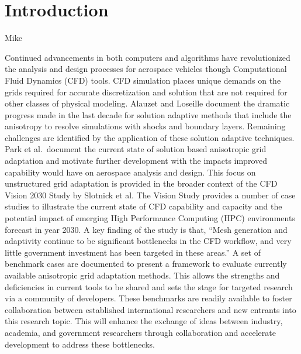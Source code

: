 \documentclass[3p,times,procedia,number]{elsarticle}
\begin{document}



\section{Introduction}
{\color{red} Mike}

Continued advancements in both computers and algorithms 
have revolutionized the analysis and design processes for
aerospace vehicles though Computational Fluid Dynamics (CFD) tools.
CFD simulation places unique demands on the grids required for
accurate discretization and solution that are not required
for other classes of physical modeling.
Alauzet and Loseille\cite{alauzet-loseille-decade-aniso-adapt-cfd}
document the dramatic progress made in the last decade
for solution adaptive methods that include the anisotropy to
resolve simulations with shocks and boundary layers.
Remaining challenges are identified
by the application of these solution adaptive techniques.
Park et al.\cite{park-unstruct-adapt-status-cfd2030}~document
the current state of solution based anisotropic
grid adaptation and motivate further development with 
the impacts improved capability would have on
aerospace analysis and design.
This focus on unstructured grid adaptation
is provided in the broader context of the 
CFD Vision 2030 Study by Slotnick et al.\cite{cfd-vision-2030}
The Vision Study provides a number of case studies
to illustrate the current state of CFD capability and capacity and the
potential impact of emerging High Performance Computing (HPC)
environments forecast in year 2030.
A key finding of the study is that, 
``Mesh generation and adaptivity continue to be significant bottlenecks
in the CFD workflow, and very little government investment has been targeted
in these areas.''\cite{cfd-vision-2030}
A set of benchmark cases are documented to present a framework to evaluate
currently available anisotropic grid adaptation methods. 
This allows the strengths and deficiencies in current tools to be shared
and sets the stage for targeted research via a community of developers.
These benchmarks are readily available to foster collaboration
between established international researchers and new
entrants into this research topic.
This will enhance the exchange of ideas between
industry, academia, and government researchers through collaboration
and accelerate development to address these bottlenecks.
\end{document}
